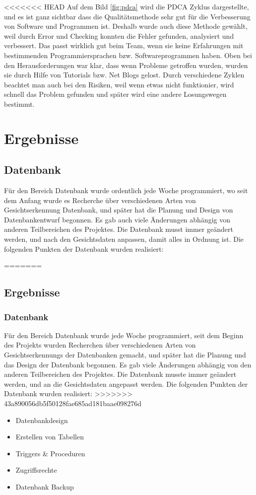 <<<<<<< HEAD
Auf dem Bild \ref{fig:pdca} wird die PDCA Zyklus dargestellte, und es ist ganz sichtbar dass die Qualitätsmethode sehr gut für die Verbesserung von Software und Programmen ist. Deshalb wurde auch diese Methode gewählt, weil durch Error und Checking konnten die Fehler gefunden, analysiert und verbessert. Das passt wirklich gut beim Team, wenn sie keine Erfahrungen mit bestimmenden Programmiersprachen bzw. Softwareprogrammen haben.
\bigbreak
Oben bei den Herausforderungen war klar, dass wenn Probleme getroffen wurden, wurden sie durch Hilfe von Tutorials bzw. Net Blogs gelost. Durch verschiedene Zyklen beachtet man auch bei den Risiken, weil wenn etwas nicht funktionier, wird schnell das Problem gefunden und später wird eine andere Losungswegen bestimmt.
 
\chapter{Ergebnisse }
\section{Datenbank}
Für den Bereich Datenbank wurde ordentlich jede Woche programmiert, wo seit dem Anfang wurde es Recherche über verschiedenen Arten von Gesichtserkennung Datenbank, und später hat die Planung und Design von Datenbankentwurf begonnen. Es gab auch viele Änderungen abhängig von anderen Teilbereichen des Projektes. Die Datenbank musst immer geändert werden, und nach den Gesichtsdaten anpassen, damit alles in Ordnung ist.
Die folgenden Punkten der Datenbank wurden realisiert:

=======
\newpage
\section{Ergebnisse}
\subsection{Datenbank}
Für den Bereich Datenbank wurde jede Woche programmiert, seit dem Beginn des Projekts wurden Recherchen über verschiedenen Arten von Gesichtserkennungs der Datenbanken gemacht, und später hat die Planung und das Design der Datenbank begonnen. Es gab viele Änderungen abhängig von den anderen Teilbereichen des Projektes. Die Datenbank musste immer geändert werden, und an die Gesichtsdaten angepasst werden. Die folgenden Punkten der Datenbank wurden realisiert:
>>>>>>> 43a890056db5f50128fae685ad181baae098276d
\begin{itemize}
	\item Datenbankdesign
	\item Erstellen von Tabellen
	\item Triggers \& Proceduren
	\item Zugriffsrechte
	\item Datenbank Backup
\end{itemize}
